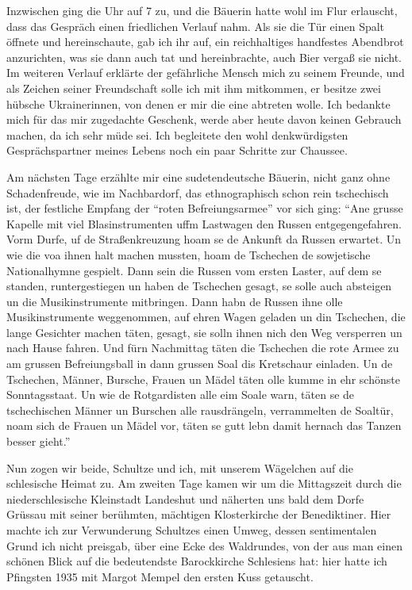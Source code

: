 \documentclass[a5paper,pagesize,10pt,twoside=true]{scrbook}
\renewcommand{\marginpar}[2][]{}
\begin{document}
Inzwischen ging die Uhr auf 7 zu, und die Bäuerin hatte wohl im Flur erlauscht, dass das Gespräch einen friedlichen Verlauf nahm. Als sie die Tür einen Spalt öffnete und hereinschaute, gab ich ihr auf, ein reichhaltiges handfestes Abendbrot anzurichten, was sie dann auch tat und hereinbrachte, auch Bier vergaß sie nicht. Im weiteren Verlauf erklärte der gefährliche Mensch mich zu seinem Freunde, und als Zeichen seiner Freundschaft solle ich mit ihm mitkommen, er besitze zwei hübsche Ukrainerinnen, von denen er mir die eine abtreten wolle. Ich bedankte mich für das mir \marginpar{78} zugedachte Geschenk, werde aber heute davon keinen Gebrauch machen, da ich sehr müde sei. Ich begleitete den wohl denkwürdigsten Gesprächspartner meines Lebens noch ein paar Schritte zur Chaussee.

Am nächsten Tage erzählte mir eine sudetendeutsche Bäuerin, nicht ganz ohne Schadenfreude, wie im Nachbardorf, das ethnographisch schon rein tschechisch ist, der festliche Empfang der \enquote{roten Befreiungsarmee} vor sich ging: \enquote{Ane grusse Kapelle mit viel Blasinstrumenten uffm Lastwagen den Russen entgegengefahren. Vorm Durfe, uf de Straßenkreuzung hoam se de Ankunft da Russen erwartet. Un wie die voa ihnen halt machen mussten, hoam de Tschechen de sowjetische Nationalhymne gespielt. Dann sein die Russen vom ersten Laster, auf dem se standen, runtergestiegen un haben de Tschechen gesagt, se solle auch absteigen un die Musikinstrumente mitbringen. Dann habn de Russen ihne olle Musikinstrumente weggenommen, auf ehren Wagen geladen un din Tschechen, die lange Gesichter machen täten, gesagt, sie solln ihnen nich den Weg versperren un nach Hause fahren. Und fürn Nachmittag täten die Tschechen die rote Armee zu am grussen Befreiungsball \marginpar{79} in dann grussen Soal dis Kretschaur einladen. Un de Tschechen, Männer, Bursche, Frauen un Mädel täten olle kumme in ehr schönste Sonntagsstaat. Un wie de Rotgardisten alle eim Soale warn, täten se de tschechischen Männer un Burschen alle rausdrängeln, verrammelten de Soaltür, noam sich de Frauen un Mädel vor, täten se gutt lebn damit hernach das Tanzen besser gieht.}

\marginpar{Freiburg 8.11.76}
Nun zogen wir beide, Schultze und ich, mit unserem Wägelchen auf die schlesische Heimat zu. Am zweiten Tage kamen wir um die Mittagszeit durch die niederschlesische Kleinstadt Landeshut und näherten uns bald dem Dorfe Grüssau mit seiner berühmten, mächtigen Klosterkirche der Benediktiner. Hier machte ich zur Verwunderung Schultzes einen Umweg, dessen sentimentalen Grund ich nicht preisgab, über eine Ecke des Waldrundes, von der aus man einen schönen Blick auf die bedeutendste Barockkirche Schlesiens hat: hier hatte ich Pfingsten 1935 mit Margot Mempel den ersten Kuss getauscht.
\end{document}
